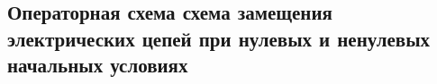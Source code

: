 \subsection{Операторная схема схема замещения электрических цепей при нулевых и ненулевых начальных условиях}



\pagebreak
